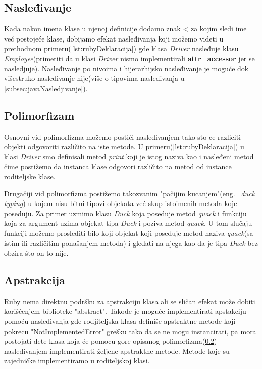 \documentclass[a4paper]{article}
\begin{document}
\subsection{Nasleđivanje}
\label{subsec:rubyNasledjivanje}
Kada nakon imena klase u njenoj definicije dodamo znak < za kojim sledi ime već postojeće klase, dobijamo efekat nasleđivanja koji možemo videti u prethodnom primeru(\ref{lst:rubyDeklaracija}) gde klasa \textit{Driver} nasleđuje klasu \textit{Employee}(primetiti da u klasi \textit{Driver} nismo implementirali \textbf{attr\_accessor} jer se nasledjuje). Nasleđivanje po nivoima i hijerarhijsko nasleđivanje je moguće dok višestruko nasleđivanje nije(više o tipovima nasleđivanja u \ref{subsec:javaNasledjivanje}).

\subsection{Polimorfizam}
\label{subsec:rubyPolimorfizam}
Osnovni vid polimorfizma možemo postići nasleđivanjem tako sto ce razliciti objekti odgovoriti različito na iste metode. U primeru(\ref{lst:rubyDeklaracija}) u klasi \textit{Driver} smo definisali metod \textit{print} koji je istog naziva kao i nasleđeni metod čime postižemo da instanca klase odgovori različito na metod od instance roditeljske klase. 

Drugačiji vid polimorfizma postižemo takozvanim "pačijim kucanjem"(eng. ~{\em duck typing}) u kojem nisu bitni tipovi objekata već skup istoimenih metoda koje poseduju. Za primer uzmimo klasu \textit{Duck} koja poseduje metod  \textit{quack} i funkciju koja za argument uzima objekat tipa \textit{Duck} i poziva metod \textit{quack}. U tom slučaju funkciji možemo proslediti bilo koji objekat koji poseduje metod naziva \textit{quack}(sa istim ili različitim ponašanjem metoda) i gledati na njega kao da je tipa \textit{Duck} bez obzira što on to nije.

\subsection{Apstrakcija}
\label{subsec:rubyApstrakcija}
Ruby nema direktnu podršku za apstrakciju klasa ali se sličan efekat može dobiti korišćenjem biblioteke "abstract". Takođe je moguće implementirati apstakciju pomoću nasleđivanja gde rodjiteljska klasa definiše apstraktne metode koji pokrecu "NotImplementedError" grešku tako da se ne mogu instancirati, pa mora postojati dete klasa koja će pomocu gore opisanog polimorfizma(\ref{subsec:rubyPolimorfizam}) nasleđivanjem implementirati željene apstraktne metode. Metode koje su zajedničke implementiramo u roditeljskoj klasi.
\end{document}
